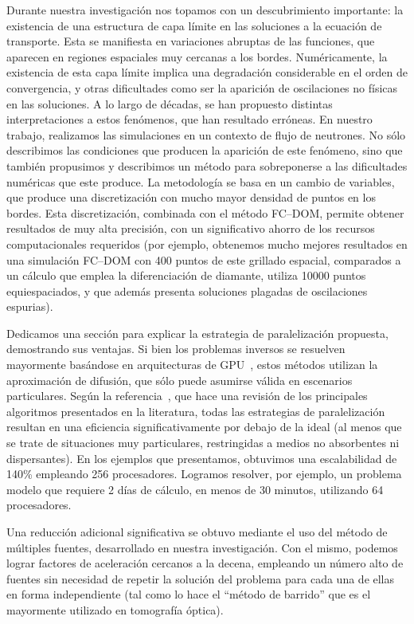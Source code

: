 Durante nuestra investigación nos topamos con un descubrimiento importante: 
la existencia de una estructura de capa límite en las soluciones a la 
ecuación de transporte. Esta se manifiesta en variaciones abruptas 
de las funciones, que aparecen en regiones espaciales 
muy cercanas a los bordes. 
Numéricamente, la existencia de esta capa límite implica una 
degradación considerable en el orden de convergencia, y otras dificultades 
como ser la aparición de oscilaciones no físicas en las soluciones. 
A lo largo de décadas, se han propuesto distintas interpretaciones a 
estos fenómenos, que han resultado erróneas.
En nuestro trabajo, realizamos las simulaciones en un contexto de flujo 
de neutrones. 
No sólo describimos las condiciones que producen la aparición de 
este fenómeno, sino que también propusimos y describimos un método 
para sobreponerse a las dificultades numéricas que este produce. 
La metodología se basa en un cambio de 
variables, que produce una discretización con mucho mayor densidad de 
puntos en los bordes. Esta discretización, combinada con el método FC--DOM, 
permite obtener resultados de muy alta precisión, con un significativo 
ahorro de los recursos computacionales requeridos (por ejemplo, 
obtenemos mucho mejores resultados en una simulación FC--DOM con 400 puntos de 
este grillado espacial, comparados a un cálculo que emplea la diferenciación de 
diamante, utiliza 10000 puntos equiespaciados, y que además presenta 
soluciones plagadas de oscilaciones espurias).

Dedicamos una sección para explicar la 
estrategia de paralelización propuesta, demostrando sus ventajas.
Si bien los problemas inversos se resuelven mayormente basándose 
en arquitecturas de GPU~\cite{Doulgerakis2017}, estos métodos 
utilizan la aproximación de difusión, que sólo puede asumirse 
válida en escenarios particulares. 
Según la referencia~\cite{Coelho2014}, que hace una revisión de los 
principales algoritmos presentados en la literatura, 
todas las estrategias de paralelización resultan en una 
eficiencia significativamente por debajo de la ideal (al menos que se 
trate de situaciones muy particulares, restringidas a medios no 
absorbentes ni dispersantes).
En los ejemplos que presentamos, obtuvimos una escalabilidad de 
140\% empleando 256 procesadores. Logramos resolver, por ejemplo, 
un problema modelo que requiere 2 días de cálculo, en menos de 30 minutos, 
utilizando 64 procesadores.

Una reducción adicional significativa se obtuvo mediante el uso 
del método de múltiples fuentes, desarrollado en nuestra investigación.
Con el mismo, podemos lograr factores de aceleración cercanos a la 
decena, empleando un número alto de fuentes sin necesidad de 
repetir la solución del problema para cada una de ellas en forma 
independiente (tal como lo hace el ``método de barrido'' 
que es el mayormente utilizado en tomografía óptica).

